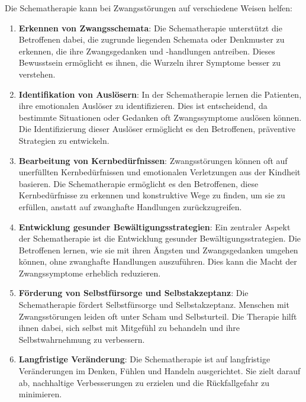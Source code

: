 Die Schematherapie kann bei Zwangsstörungen auf verschiedene Weisen helfen:

\begin{enumerate}
  \item \textbf{Erkennen von Zwangsschemata}: Die Schematherapie unterstützt die Betroffenen dabei, die zugrunde liegenden Schemata oder Denkmuster zu erkennen, die ihre Zwangsgedanken und -handlungen antreiben. Dieses Bewusstsein ermöglicht es ihnen, die Wurzeln ihrer Symptome besser zu verstehen.

  \item \textbf{Identifikation von Auslösern}: In der Schematherapie lernen die Patienten, ihre emotionalen Auslöser zu identifizieren. Dies ist entscheidend, da bestimmte Situationen oder Gedanken oft Zwangssymptome auslösen können. Die Identifizierung dieser Auslöser ermöglicht es den Betroffenen, präventive Strategien zu entwickeln.

  \item \textbf{Bearbeitung von Kernbedürfnissen}: Zwangsstörungen können oft auf unerfüllten Kernbedürfnissen und emotionalen Verletzungen aus der Kindheit basieren. Die Schematherapie ermöglicht es den Betroffenen, diese Kernbedürfnisse zu erkennen und konstruktive Wege zu finden, um sie zu erfüllen, anstatt auf zwanghafte Handlungen zurückzugreifen.

  \item \textbf{Entwicklung gesunder Bewältigungsstrategien}: Ein zentraler Aspekt der Schematherapie ist die Entwicklung gesunder Bewältigungsstrategien. Die Betroffenen lernen, wie sie mit ihren Ängsten und Zwangsgedanken umgehen können, ohne zwanghafte Handlungen auszuführen. Dies kann die Macht der Zwangssymptome erheblich reduzieren.

  \item \textbf{Förderung von Selbstfürsorge und Selbstakzeptanz}: Die Schematherapie fördert Selbstfürsorge und Selbstakzeptanz. Menschen mit Zwangsstörungen leiden oft unter Scham und Selbsturteil. Die Therapie hilft ihnen dabei, sich selbst mit Mitgefühl zu behandeln und ihre Selbstwahrnehmung zu verbessern.

  \item \textbf{Langfristige Veränderung}: Die Schematherapie ist auf langfristige Veränderungen im Denken, Fühlen und Handeln ausgerichtet. Sie zielt darauf ab, nachhaltige Verbesserungen zu erzielen und die Rückfallgefahr zu minimieren.

\end{enumerate}

